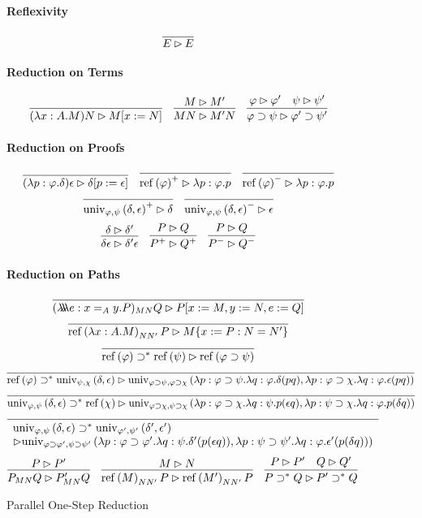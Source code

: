\documentclass[a4paper,UKenglish]{lipics-v2016}
\newcommand*{\reff}[1]{\ensuremath{\mathrm{ref} \left( {#1} \right)}}
\newcommand*{\univ}[4]{\ensuremath{\mathrm{univ}_{{#1}, {#2}} \left({#3} , {#4} \right)}}
\newcommand*{\triplelambda}{\ensuremath{\lambda \!\! \lambda \!\! \lambda}}
\theoremstyle{plain}
\theoremstyle{definition}
\begin{document}
\begin{figure}
\paragraph*{Reflexivity}
$$ \infer{E \rhd E}{} $$
\paragraph*{Reduction on Terms}
$$ \infer{(\lambda x:A.M)N \rhd M[x:=N]}{} \quad
\infer{MN \rhd M'N}{M \rhd M'} \quad
\infer{\varphi \supset \psi \rhd \varphi' \supset \psi'}{\varphi \rhd \varphi' \quad \psi \rhd \psi'} $$
\paragraph*{Reduction on Proofs}
$$\infer{(\lambda p : \varphi . \delta)\epsilon \rhd \delta [ p := \epsilon ]}{} \quad
\infer{\reff{\varphi}^+ \rhd \lambda p : \varphi . p}{} \quad
\infer{\reff{\varphi}^- \rhd \lambda p : \varphi . p}{} $$
$$ \infer{\univ{\varphi}{\psi}{\delta}{\epsilon}^+ \rhd \delta}{} \quad
\infer{\univ{\varphi}{\psi}{\delta}{\epsilon}^- \rhd \epsilon}{} $$
$$ \infer{\delta \epsilon \rhd \delta' \epsilon}{\delta \rhd \delta'} \quad \infer{P^+ \rhd Q^+}{P \rhd Q} \quad
\infer{P^- \rhd Q^-}{P \rhd Q}$$
\paragraph*{Reduction on Paths}
$$\infer{(\triplelambda e:x =_A y.P)_{MN} Q \rhd P [x := M, y := N, e := Q]}{} $$
$$ \infer{\reff{\lambda x:A.M}_{N N'} P \rhd M \{ x:=P : N = N' \}}{} $$
$$ \infer{\reff{\varphi} \supset^* \reff{\psi} \rhd \reff{\varphi \supset \psi}}{} $$
$$ \infer{\reff{\varphi} \supset^* \univ{\psi}{\chi}{\delta}{\epsilon} \rhd
\univ{\varphi \supset \psi}{\varphi \supset \chi}{\lambda p:\varphi \supset \psi. \lambda q : \varphi. \delta (pq)}{\lambda p : \varphi \supset \chi. \lambda q : \varphi. \epsilon (pq)}}{} $$
$$ \infer{\univ{\varphi}{\psi}{\delta}{\epsilon} \supset^* \reff{\chi} \rhd
\univ{\varphi \supset \chi}{\psi \supset \chi}{\lambda p : \varphi \supset \chi. \lambda q : \psi. p (\epsilon q)}{\lambda p:\psi \supset \chi. \lambda q : \varphi. p(\delta q)}}{} $$
$$ \infer{\begin{array}{l}
\univ{\varphi}{\psi}{\delta}{\epsilon} \supset^* \univ{\varphi'}{\psi'}{\delta'}{\epsilon'} \\
 \rhd
\univ{\varphi \supset \varphi'}{\psi \supset \psi'}{\lambda p : \varphi \supset \varphi'. \lambda q : \psi. \delta' (p(\epsilon q))}{\lambda p : \psi \supset \psi'. \lambda q : \varphi. \epsilon' (p (\delta q))}
\end{array}}{} $$
$$ \infer{P_{MN} Q \rhd P'_{MN} Q}{P \rhd P'} \quad
\infer{\reff{M}_{NN'}P \rhd \reff{M'}_{NN'}P}{M \rhd N} \quad
\infer{P \supset^* Q \rhd P' \supset^* Q}{P \rhd P' \quad Q \rhd Q'} $$
\caption{Parallel One-Step Reduction}
\label{fig:POSR}
\end{figure}
\end{document}
